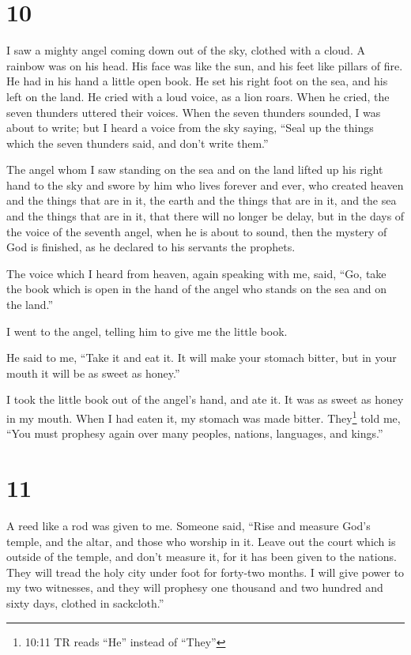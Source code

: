 \hypertarget{section-9}{%
\section{10}\label{section-9}}

 I saw a mighty angel coming down out of the sky, clothed
with a cloud. A rainbow was on his head. His face was like the sun, and
his feet like pillars of fire.  He had in his hand a little
open book. He set his right foot on the sea, and his left on the land.
 He cried with a loud voice, as a lion roars. When he cried,
the seven thunders uttered their voices.  When the seven
thunders sounded, I was about to write; but I heard a voice from the sky
saying, ``Seal up the things which the seven thunders said, and don't
write them.''

 The angel whom I saw standing on the sea and on the land
lifted up his right hand to the sky  and swore by him who
lives forever and ever, who created heaven and the things that are in
it, the earth and the things that are in it, and the sea and the things
that are in it, that there will no longer be delay,  but in
the days of the voice of the seventh angel, when he is about to sound,
then the mystery of God is finished, as he declared to his servants the
prophets.

 The voice which I heard from heaven, again speaking with
me, said, ``Go, take the book which is open in the hand of the angel who
stands on the sea and on the land.''

 I went to the angel, telling him to give me the little
book.

He said to me, ``Take it and eat it. It will make your stomach bitter,
but in your mouth it will be as sweet as honey.''

 I took the little book out of the angel's hand, and ate
it. It was as sweet as honey in my mouth. When I had eaten it, my
stomach was made bitter.  They\footnote{10:11 TR reads
  ``He'' instead of ``They''} told me, ``You must prophesy again over
many peoples, nations, languages, and kings.''

\hypertarget{section-10}{%
\section{11}\label{section-10}}

 A reed like a rod was given to me. Someone said, ``Rise and
measure God's temple, and the altar, and those who worship in it.
 Leave out the court which is outside of the temple, and
don't measure it, for it has been given to the nations. They will tread
the holy city under foot for forty-two months.  I will give
power to my two witnesses, and they will prophesy one thousand and two
hundred and sixty days, clothed in sackcloth.''

